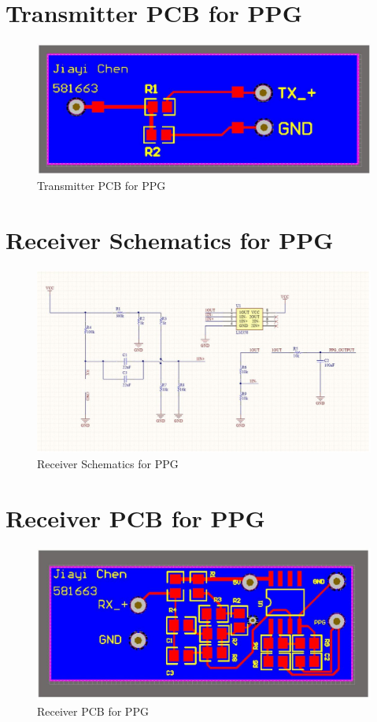 \section{Transmitter PCB for PPG}

\begin{figure}[H]
	\centering
	\includegraphics[width=\linewidth]{georgepic15.jpg}
	\caption{Transmitter PCB for PPG}
\end{figure}

\section{Receiver Schematics for PPG}

\begin{figure}[H]
	\centering
	\includegraphics[width=\linewidth]{georgepic16.jpg}
	\caption{Receiver Schematics for PPG}
\end{figure}

\section{Receiver PCB for PPG}

\begin{figure}[H]
	\centering
	\includegraphics[width=\linewidth]{georgepic17.jpg}
	\caption{Receiver PCB for PPG}
\end{figure}